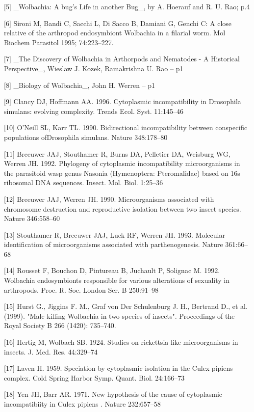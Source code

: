 \documentclass[twocolumn]{article}
\begin{document}
[5] \_Wolbachia: A bug's Life in another Bug\_, by A. Hoerauf and R. U. Rao;  p.4

[6] Sironi M, Bandi C, Sacchi L, Di Sacco B, Damiani G, Genchi C: A close relative of the arthropod endosymbiont Wolbachia in a filarial worm. Mol Biochem Parasitol 1995; 74:223–227.

[7] \_The Discovery of Wolbachia in Arthorpods and Nematodes - A Historical Perspective\_, Wieslaw J. Kozek, Ramakrishna U. Rao  -- p1

[8] \_Biology of Wolbachia\_, John H. Werren  -- p1

[9] Clancy DJ, Hoffmann AA. 1996. Cytoplasmic incompatibility in Drosophila simulans: evolving complexity. Trends Ecol. Syst. 11:145–46

[10] O’Neill SL, Karr TL. 1990. Bidirectional incompatibility between conspecific populations ofDrosophila simulans. Nature 348:178–80

[11] Breeuwer JAJ, Stouthamer R, Burns DA, Pelletier DA, Weisburg WG, Werren JH. 1992. Phylogeny of cytoplasmic incompatibility microorganisms in the parasitoid wasp genus Nasonia (Hymenoptera: Pteromalidae) based on 16s ribosomal DNA sequences. Insect. Mol. Biol. 1:25–36

[12] Breeuwer JAJ, Werren JH. 1990. Microorganisms associated with chromosome destruction and reproductive isolation between two insect species. Nature 346:558–60

[13] Stouthamer R, Breeuwer JAJ, Luck RF, Werren JH. 1993. Molecular identification of microorganisms associated with parthenogenesis. Nature 361:66–68 

[14] Rousset F, Bouchon D, Pintureau B, Juchault P, Solignac M. 1992. Wolbachia endosymbionts responsible for various alterations of sexuality in arthropods. Proc. R. Soc. London Ser. B 250:91–98

[15] Hurst G., Jiggins F. M., Graf von Der Schulenburg J. H., Bertrand D., et al. (1999). "Male killing Wolbachia in two species of insects". Proceedings of the Royal Society B 266 (1420): 735–740.  

[16] Hertig M, Wolbach SB. 1924. Studies on rickettsia-like microorganisms in insects. J. Med. Res. 44:329–74

[17] Laven H. 1959. Speciation by cytoplasmic isolation in the Culex pipiens complex. Cold Spring Harbor Symp. Quant. Biol. 24:166–73

[18] Yen JH, Barr AR. 1971. New hypothesis of the cause of cytoplasmic incompatibiity in Culex pipiens . Nature 232:657–58
\end{document}
